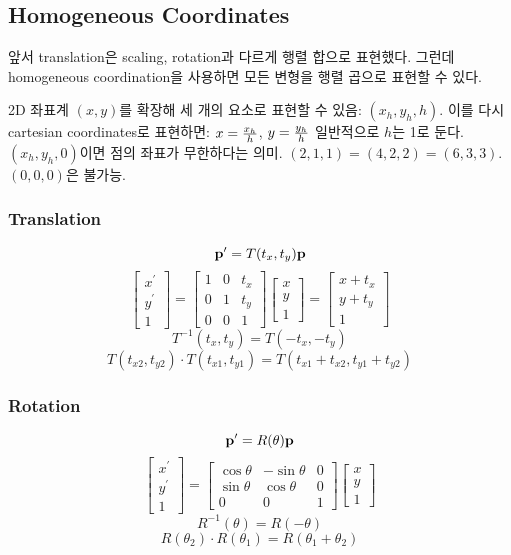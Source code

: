 \subsection{Homogeneous Coordinates}

앞서 translation은 scaling, rotation과 다르게 행렬 합으로 표현했다. 그런데 homogeneous coordination을 사용하면 모든 변형을 행렬 곱으로 표현할 수 있다.

2D 좌표계 $(x, y)$를 확장해 세 개의 요소로 표현할 수 있음: $(x_h, y_h, h)$. 이를 다시 cartesian coordinates로 표현하면: $x = {x_h \over h}$, $y = {y_h \over h}$ 일반적으로 $h$는 1로 둔다. $(x_h, y_h, 0)$이면 점의 좌표가 무한하다는 의미. $(2, 1, 1) = (4, 2, 2) = (6, 3, 3)$. $(0, 0, 0)$은 불가능.

\subsubsection{Translation}

$$\bold{p}^\prime = T(t_x, t_y)\bold{p}$$
$$
\begin{bmatrix}
  x^\prime \\
  y^\prime \\
  1
\end{bmatrix}
{=}
\begin{bmatrix}
  1 & 0 & t_x \\
  0 & 1 & t_y \\
  0 & 0 & 1
\end{bmatrix}
\begin{bmatrix}
  x \\
  y \\
  1
\end{bmatrix}
{=}
\begin{bmatrix}
  x + t_x \\
  y + t_y \\
  1
\end{bmatrix}
$$
$$T^{-1}(t_x, t_y) = T(-t_x, -t_y)$$
$$T(t_{x2}, t_{y2}) \cdot T(t_{x1}, t_{y1}) = T(t_{x1} + t_{x2}, t_{y1} + t_{y2})$$

\subsubsection{Rotation}

$$\bold{p}^\prime = R(\theta)\bold{p}$$
$$
\begin{bmatrix}
  x^\prime \\
  y^\prime \\
  1
\end{bmatrix}
{=}
\begin{bmatrix}
  \cos{\theta} & -\sin{\theta} & 0 \\
  \sin{\theta} & \cos{\theta} & 0 \\
  0 & 0 & 1
\end{bmatrix}
\begin{bmatrix}
  x \\
  y \\
  1
\end{bmatrix}
$$
$$R^{-1}(\theta) = R(-\theta)$$
$$R(\theta_2) \cdot R(\theta_1) = R(\theta_1 + \theta_2)$$

